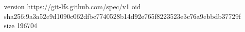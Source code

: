 version https://git-lfs.github.com/spec/v1
oid sha256:9a3a52e9d1090c062dfbc7740528b14d92e765f8223523e3c76a9ebbdb37729f
size 196704
